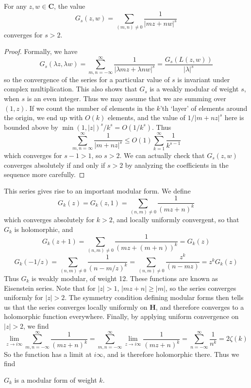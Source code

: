 \begin{lemma}
    For any $z,w \in \mathbf{C}$, the value
    \[ G_s(z,w) = \sum_{(m,n) \neq 0} \frac{1}{|mz + nw|^s} \]
    converges for $s > 2$.
\end{lemma}
\begin{proof}
    Formally, we have
    \[ G_s(\lambda z, \lambda w) = \sum_{m,n = -\infty}^\infty \frac{1}{|\lambda m z + \lambda n w|^s} = \frac{G_s(L(z,w))}{|\lambda|^s} \]
    so the convergence of the series for a particular value of $s$ is invariant under complex multiplication. This also shows that $G_s$ is a weakly modular of weight $s$, when $s$ is an even integer. Thus we may assume that we are summing over $(1,z)$. If we count the number of elements in the $k$'th `layer' of elements around the origin, we end up with $O(k)$ elements, and the value of $1/|m + nz|^s$ here is bounded above by $\min(1,|z|)^s/k^s = O(1/k^s)$. Thus
    \[ \sum_{m,n = \infty}^\infty \frac{1}{|m + n z|^s} \leq O(1) \sum_{k = 1}^\infty \frac{1}{k^{s-1}} \]
    which converges for $s - 1 > 1$, so $s > 2$. We can actually check that $G_s(z,w)$ converges absolutely if and only if $s > 2$ by analyzing the coefficients in the sequence more carefully.
\end{proof}

This series gives rise to an important modular form. We define
%
\[ G_k(z) = G_k(z,1) = \sum_{(n,m) \neq 0} \frac{1}{(mz + n)^{k}} \]
%
which converges absolutely for $k > 2$, and locally uniformly convergent, so that $G_k$ is holomorphic, and
%
\[ G_k(z + 1) = \sum_{(n,m) \neq 0} \frac{1}{(mz + (m + n))^k} = G_k(z) \]
%
\[ G_k(-1/z) = \sum_{(n,m) \neq 0} \frac{1}{(n - m/z)^k} = \sum_{(n,m) \neq 0} \frac{z^k}{(n - mz)} = z^k G_k(z) \]
%
Thus $G_k$ is weakly modular, of weight 12. These functions are known as Eisenstein series. Note that for $|z| > 1$, $|mz + n| \geq |m|$, so the series converges uniformly for $|z| > 2$. The symmetry condition defining modular forms then tells us that the series converges locally uniformly on $\mathbf{H}$, and therefore converges to a holomorphic function everywhere. Finally, by applying uniform convergence on $|z| > 2$, we find
%
\[ \lim_{z \to i\infty} \sum_{m,n = -\infty}^\infty \frac{1}{(mz + n)^k} = \sum_{m,n = -\infty}^\infty \lim_{z \to i \infty} \frac{1}{(mz + n)^k} = \sum_{n = -\infty}^\infty \frac{1}{n^k} = 2 \zeta(k) \]
%
So the function has a limit at $i \infty$, and is therefore holomorphic there. Thus we find

\begin{theorem}
    $G_k$ is a modular form of weight $k$.
\end{theorem}

